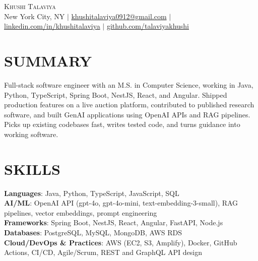 \documentclass[letterpaper,11pt]{article}
\begin{document}
\begin{center}
    {\Huge \scshape Khushi Talaviya} \\ \vspace{2pt}
    \vspace{4pt}
    \small
    New York City, NY $|$
    \href{mailto:khushitalaviya0912@gmail.com}{khushitalaviya0912@gmail.com} $|$
    \href{https://www.linkedin.com/in/khushitalaviya/}{linkedin.com/in/khushitalaviya} $|$
    \href{https://github.com/talaviyakhushi}{github.com/talaviyakhushi}
\end{center}

\section{SUMMARY}
\vspace{5pt}
\small{Full-stack software engineer with an M.S. in Computer Science, working in Java, Python, TypeScript, Spring Boot, NestJS, React, and Angular. Shipped production features on a live auction platform, contributed to published research software, and built GenAI applications using OpenAI APIs and RAG pipelines. Picks up existing codebases fast, writes tested code, and turns guidance into working software.}

\vspace{2pt}
\section{SKILLS}
\vspace{5pt}
\begin{itemize}[leftmargin=0in, label={}]
\small{\item{
\textbf{Languages}{: Java, Python, TypeScript, JavaScript, SQL} \\
\textbf{AI/ML}{: OpenAI API (gpt-4o, gpt-4o-mini, text-embedding-3-small), RAG pipelines, vector embeddings, prompt engineering} \\
\textbf{Frameworks}{: Spring Boot, NestJS, React, Angular, FastAPI, Node.js} \\
\textbf{Databases}{: PostgreSQL, MySQL, MongoDB, AWS RDS} \\
\textbf{Cloud/DevOps \& Practices}{: AWS (EC2, S3, Amplify), Docker, GitHub Actions, CI/CD, Agile/Scrum, REST and GraphQL API design}
}}
\end{itemize}
\vspace{-10pt}

\end{document}
